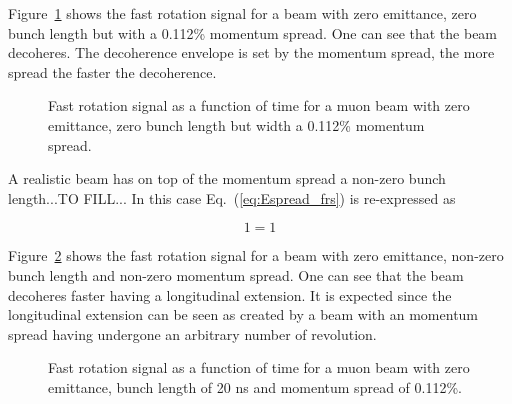 Figure~\ref{fig:Espread_frs} shows the fast rotation signal for a beam with zero emittance, zero bunch length but with a 0.112\% momentum spread. 
One can see that the beam decoheres. The decoherence envelope is set by the momentum spread, the more spread the faster the decoherence.

\begin{figure}[bt]

\caption{Fast rotation signal as a function of time for a muon beam with zero emittance, zero bunch length but width a 0.112\% momentum spread.}
\label{fig:Espread_frs}
\end{figure}

A realistic beam has on top of the momentum spread a non-zero bunch length...TO FILL... In this case Eq.~(\ref{eq:Espread_frs}) is re-expressed as

\begin{equation}
1=1
\end{equation}

Figure~\ref{fig:E_T_spread_frs} shows the fast rotation signal for a beam with zero emittance, non-zero bunch length and non-zero momentum spread.
One can see that the beam decoheres faster having a longitudinal extension. It is expected since the longitudinal extension can be seen as 
created by a beam with an momentum spread having undergone an arbitrary number of revolution.

\begin{figure}[bt]

\caption{Fast rotation signal as a function of time for a muon beam with zero emittance, bunch length of 20 ns and momentum spread of 0.112\%.}
\label{fig:E_T_spread_frs}
\end{figure}
